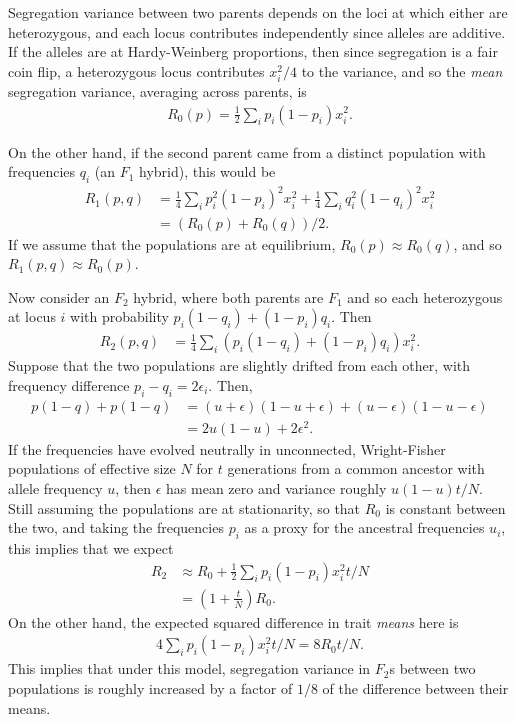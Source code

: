 \documentclass{article}
\newcommand{\1}{\mathbbm{1}}
\begin{document}
Segregation variance between two parents depends on the loci at which either are heterozygous,
and each locus contributes independently
since alleles are additive.
If the alleles are at Hardy-Weinberg proportions,
then since segregation is a fair coin flip, a heterozygous locus contributes $x_i^2/4$ to the variance,
and so the \emph{mean} segregation variance, averaging across parents, is
\begin{align*}
    R_0(p) = \frac{1}{2} \sum_i p_i (1-p_i) x_i^2 .
\end{align*}

On the other hand,
if the second parent came from a distinct population
with frequencies $q_i$
(an $F_1$ hybrid),
this would be
\begin{align*}
    R_1(p,q) &= \frac{1}{4} \sum_i p_i^2 (1-p_i)^2 x_i^2 
                + \frac{1}{4} \sum_i q_i^2 (1-q_i)^2 x_i^2 \\
                &= (R_0(p) + R_0(q))/2 .
\end{align*}
If we assume that the populations are at equilibrium, $R_0(p) \approx R_0(q)$,
and so $R_1(p,q) \approx R_0(p)$.

Now consider an $F_2$ hybrid, where both parents are $F_1$
and so each heterozygous at locus $i$ with probability $p_i (1-q_i) + (1-p_i) q_i$.
Then
\begin{align*}
    R_2(p,q) &= \frac{1}{4} \sum_i \left(p_i (1-q_i) + (1-p_i) q_i \right) x_i^2  .
\end{align*}
Suppose that the two populations are slightly drifted from each other,
with frequency difference $p_i-q_i = 2\epsilon_i$.
Then,
\begin{align*}
    p (1-q) + p (1-q)
    &=
    (u+\epsilon) (1-u+\epsilon) + (u-\epsilon) (1-u-\epsilon) \\
    &=
    2 u (1-u)
    + 2 \epsilon^2 .
\end{align*}
If the frequencies have evolved neutrally in unconnected, Wright-Fisher populations 
of effective size $N$ for $t$ generations from a common ancestor with allele frequency $u$,
then $\epsilon$ has mean zero and variance roughly $u (1-u) t/N$.
Still assuming the populations are at stationarity,
so that $R_0$ is constant between the two,
and taking the frequencies $p_i$ as a proxy for the ancestral frequencies $u_i$,
this implies that we expect
\begin{align*}
    R_2 
    &\approx 
    R_0 + \frac{1}{2} \sum_i p_i (1-p_i) x_i^2 t/N \\
    &=
    \left( 1 + \frac{t}{N} \right) R_0 .
\end{align*}
On the other hand, the expected squared difference in trait \emph{means} here is
\begin{align} \label{eqn:var_dx}
    4 \sum_i p_i (1-p_i) x_i^2 t / N = 8 R_0 t /N .
\end{align}
This implies that under this model,
segregation variance in $F_2$s between two populations
is roughly increased by a factor of $1/8$ of the difference between their means.
\end{document}

